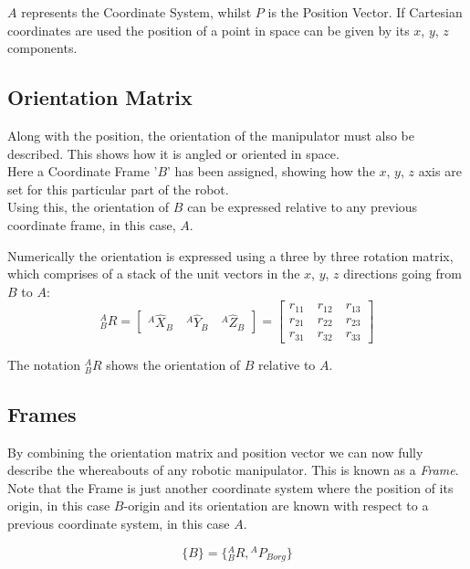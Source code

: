 \documentclass[11pt]{article}
\theoremstyle{definition}
\begin{document}
$A$ represents the Coordinate System, whilst $P$ is the Position Vector.
If Cartesian coordinates are used the position of a point in space can be given by its $x$, $y$, $z$ components.

\subsection{Orientation Matrix}
Along with the position, the orientation of the manipulator must also be described. This shows how it is angled or oriented in space. \\
Here a Coordinate Frame '$B$' has been assigned, showing how the $x$, $y$, $z$ axis are set for this particular part of the robot.\\
Using this, the orientation of $B$ can be expressed relative to any previous coordinate frame, in this case, $A$.

Numerically the orientation is expressed using a three by three rotation matrix, which comprises of a stack of the unit vectors in the $x$, $y$, $z$ directions going from $B$ to $A$:
\begin{equation}
{}^{A}_{B}R = \begin{bmatrix} {}^{A}\hat{X}_{B} \quad {}^{A}\hat{Y}_{B} \quad {}^{A}\hat{Z}_{B} \end{bmatrix} = \begin{bmatrix} r_{11} \quad r_{12} \quad r_{13} \\ r_{21} \quad r_{22} \quad r_{23} \\ r_{31} \quad r_{32} \quad r_{33} \end{bmatrix}
\end{equation}

The notation ${}^{A}_{B}R$ shows the orientation of $B$ relative to $A$. 

\subsection{Frames}
By combining the orientation matrix and position vector we can now fully describe the whereabouts of any robotic manipulator. This is known as a \textit{Frame}. Note that the Frame is just another coordinate system where the position of its origin, in this case $B$-origin and its orientation are known with respect to a previous coordinate system, in this case $A$.
\begin{shaded}
\begin{equation}
\{B\} = \{{}^{A}_{B}R, {}^{A}P_{Borg}\}
\end{equation}
\end{shaded}
\end{document}
